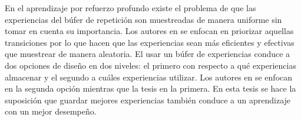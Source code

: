En el aprendizaje por refuerzo profundo existe el problema de que las experiencias del búfer de repetición son muestreadas de manera uniforme sin tomar en cuenta su importancia. Los autores en \cite{schaul2015prioritized}  se enfocan en priorizar aquellas transiciones por lo que hacen que las experiencias sean más eficientes y efectivas que muestrear de manera aleatoria. El usar un búfer de experiencias conduce a dos opciones de diseño en dos niveles: el primero con respecto a qué experiencias almacenar y el segundo a cuáles experiencias utilizar. Los autores en \cite{schaul2015prioritized} se enfocan en la segunda opción mientras que la tesis en la primera. En esta tesis se hace la suposición que guardar mejores experiencias también conduce a un aprendizaje con un mejor desempeño.



